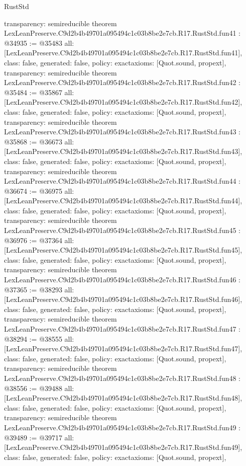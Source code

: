 \begin{lexlean}{RustStd}
\begin{coremodule}
{  transparency: semireducible
}
theorem LexLeanPreserve.C9d2b4b49701a095494c1c03b8be2e7cb.R17.RustStd.fun41 : @34935 := @35483 {
  all: [LexLeanPreserve.C9d2b4b49701a095494c1c03b8be2e7cb.R17.RustStd.fun41],
  class: false,
  generated: false,
  policy: exact{axioms: [Quot.sound, propext]},
  transparency: semireducible
}
theorem LexLeanPreserve.C9d2b4b49701a095494c1c03b8be2e7cb.R17.RustStd.fun42 : @35484 := @35867 {
  all: [LexLeanPreserve.C9d2b4b49701a095494c1c03b8be2e7cb.R17.RustStd.fun42],
  class: false,
  generated: false,
  policy: exact{axioms: [Quot.sound, propext]},
  transparency: semireducible
}
theorem LexLeanPreserve.C9d2b4b49701a095494c1c03b8be2e7cb.R17.RustStd.fun43 : @35868 := @36673 {
  all: [LexLeanPreserve.C9d2b4b49701a095494c1c03b8be2e7cb.R17.RustStd.fun43],
  class: false,
  generated: false,
  policy: exact{axioms: [Quot.sound, propext]},
  transparency: semireducible
}
theorem LexLeanPreserve.C9d2b4b49701a095494c1c03b8be2e7cb.R17.RustStd.fun44 : @36674 := @36975 {
  all: [LexLeanPreserve.C9d2b4b49701a095494c1c03b8be2e7cb.R17.RustStd.fun44],
  class: false,
  generated: false,
  policy: exact{axioms: [Quot.sound, propext]},
  transparency: semireducible
}
theorem LexLeanPreserve.C9d2b4b49701a095494c1c03b8be2e7cb.R17.RustStd.fun45 : @36976 := @37364 {
  all: [LexLeanPreserve.C9d2b4b49701a095494c1c03b8be2e7cb.R17.RustStd.fun45],
  class: false,
  generated: false,
  policy: exact{axioms: [Quot.sound, propext]},
  transparency: semireducible
}
theorem LexLeanPreserve.C9d2b4b49701a095494c1c03b8be2e7cb.R17.RustStd.fun46 : @37365 := @38293 {
  all: [LexLeanPreserve.C9d2b4b49701a095494c1c03b8be2e7cb.R17.RustStd.fun46],
  class: false,
  generated: false,
  policy: exact{axioms: [Quot.sound, propext]},
  transparency: semireducible
}
theorem LexLeanPreserve.C9d2b4b49701a095494c1c03b8be2e7cb.R17.RustStd.fun47 : @38294 := @38555 {
  all: [LexLeanPreserve.C9d2b4b49701a095494c1c03b8be2e7cb.R17.RustStd.fun47],
  class: false,
  generated: false,
  policy: exact{axioms: [Quot.sound, propext]},
  transparency: semireducible
}
theorem LexLeanPreserve.C9d2b4b49701a095494c1c03b8be2e7cb.R17.RustStd.fun48 : @38556 := @39488 {
  all: [LexLeanPreserve.C9d2b4b49701a095494c1c03b8be2e7cb.R17.RustStd.fun48],
  class: false,
  generated: false,
  policy: exact{axioms: [Quot.sound, propext]},
  transparency: semireducible
}
theorem LexLeanPreserve.C9d2b4b49701a095494c1c03b8be2e7cb.R17.RustStd.fun49 : @39489 := @39717 {
  all: [LexLeanPreserve.C9d2b4b49701a095494c1c03b8be2e7cb.R17.RustStd.fun49],
  class: false,
  generated: false,
  policy: exact{axioms: [Quot.sound, propext]},
}
\end{coremodule}
\end{lexlean}
